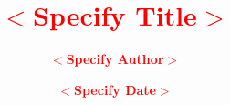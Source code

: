 \newenvironment{shellenv}%
{\VerbatimEnvironment%
 \begin{Sbox}\begin{minipage}{0.97\textwidth}\begin{Verbatim}%
}%
{\end{Verbatim}\end{minipage}\end{Sbox}%
\setlength{\fboxsep}{6pt}\shadowbox{\TheSbox}}%

\newcommand{\file}[1]{\texttt{#1}}

\newcommand{\parameter}[1]{$<$#1$>$}


\newcommand{\misspar}[1]{\textcolor{red}{\textbf{$<$#1$>$}}}

\makeatletter

\title{\misspar{Specify Title}}%
\author{\misspar{Specify Author}}%
\date{\misspar{Specify Date}}%

\def\@semester{\misspar{Specify Semester}}%
\newcommand{\setsemester}[1]{\def\@semester{#1}}%
\let\semester\setsemester%
\newcommand{\show@semester}{\@semester}%

\def\@reporttype{\misspar{Specify Report Type}}%
\newcommand{\setreporttype}[1]{\def\@reporttype{#1}}%
\let\reporttype\setreporttype%
\newcommand{\show@reporttype}{\@reporttype}%

\def\@titlelogo{}%
\newcommand{\settitlelogo}[1]{\def\@titlelogo{#1}}%
\let\titlelogo\settitlelogo%

\def\@logoheight{7cm}%
\newcommand{\setlogoheight}[1]{\def\@logoheight{#1}}%
\let\logoheight\setlogoheight%
\newcommand{\show@logoheight}{\@logoheight}%


